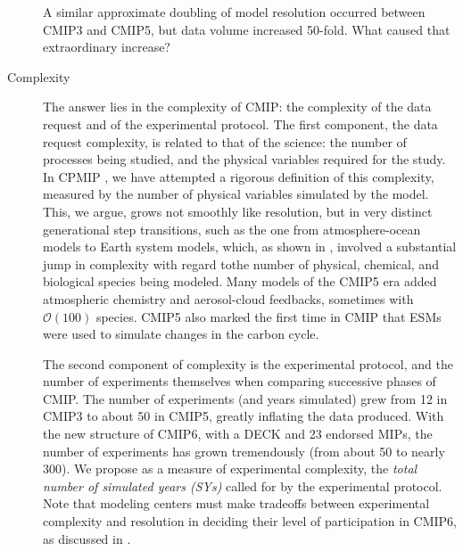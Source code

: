 \documentclass[gmd,manuscript]{copernicus}
\begin{document}
\begin{description}
  A similar approximate doubling of model resolution occurred between CMIP3 
  and CMIP5, but data volume increased 50-fold. What caused that
  extraordinary increase?
\item[Complexity] The answer lies in the complexity of CMIP: the
  complexity of the data request and of the experimental protocol.
  The first component, the
  data request complexity, is related to that of the science: the
  number of processes being studied, and the physical variables
  required for the study. In CPMIP \citep{ref:balajietal2017}, we have
  attempted a rigorous definition of this complexity, measured by the
  number of physical variables simulated by the model. This, we argue,
  grows not smoothly like resolution, but in very distinct
  generational step transitions, such as the one from atmosphere-ocean
  models to Earth system models, which, as shown in \cite{ref:balajietal2017},
   involved a substantial jump in
  complexity with regard tothe number of physical, chemical, and biological species
  being modeled.
   Many models of the CMIP5 era added
  atmospheric chemistry and aerosol-cloud feedbacks, sometimes with
  $\mathcal{O}(100)$ species. CMIP5 also marked the first time in CMIP
  that ESMs were used to simulate changes in the carbon cycle.

  The second component of complexity is the experimental protocol, and 
  the number of experiments themselves when comparing successive phases of CMIP.
  The number of experiments (and years simulated) grew from 12 in CMIP3 to about 50
  in CMIP5, greatly inflating the data produced.
   With the new structure of CMIP6, with a DECK and 23 endorsed MIPs, the 
  number of experiments has grown tremendously (from about 50 to nearly 300). 
  We propose as a measure of experimental
  complexity, the \emph{total number of simulated years (SYs)}
  called for by the experimental protocol. 
  Note that 
  modeling centers must make tradeoffs between experimental
  complexity and resolution in deciding their level of participation
  in CMIP6, as discussed in \cite{ref:balajietal2017}.
\end{description}
\end{document}
